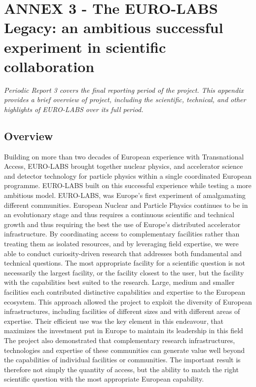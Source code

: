 \newpage
\section{ANNEX 3 - The EURO-LABS Legacy: an ambitious successful experiment in scientific collaboration} 
\textit{Periodic Report 3 covers the final reporting period of the project. This appendix provides a brief overview of project, including the scientific, technical, and other highlights of   EURO-LABS over its full period.}
\subsection{Overview}
Building on more than two decades of European experience with Transnational Access, EURO-LABS brought together nuclear physics, and accelerator science and detector technology for particle physics within a single coordinated European programme. EURO-LABS built on this successful experience while testing a more ambitious model. EURO-LABS, was Europe’s first experiment of amalgamating different communities.  European Nuclear and Particle Physics continues to be in an evolutionary stage and thus requires a continuous scientific and technical growth and thus requiring the best  the use of Europe's distributed accelerator infrastructure. 
By coordinating access to complementary facilities rather than treating them as isolated resources, and by leveraging field expertise, we were able to conduct curiosity-driven research that addresses both fundamental and technical questions.
The most appropriate facility for a scientific question is not necessarily the largest facility, or the facility closest to the user, but the facility with the capabilities best suited to the research. Large, medium and smaller facilities each contributed distinctive capabilities and expertise to the European ecosystem. This approach allowed the project to exploit the diversity of European infrastructures, including facilities of different sizes and with different areas of expertise. Their efficient use was the key element in this endeavour, that maximizes the investment put in Europe to maintain its leadership in this field  The project also demonstrated that complementary research infrastructures, technologies and expertise of these communities can generate value well beyond the capabilities of individual facilities or communities. The important result is therefore not simply the quantity of access, but the ability to match the right scientific question with the most appropriate European capability.

